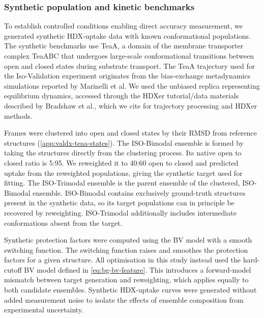\subsubsection{Synthetic population and kinetic benchmarks}
\label{sec:valdx-synthetic}

To establish controlled conditions enabling direct accuracy measurement, we generated synthetic HDX-uptake data with known conformational populations. The synthetic benchmarks use TeaA, a domain of the membrane transporter complex TeaABC that undergoes large-scale conformational transitions between open and closed states during substrate transport.\supercite{marinelliEvidenceAllostericMechanism2011,leeInterpretingHydrogenDeuteriumExchange2021} The TeaA trajectory used for the Iso-Validation experiment originates from the bias-exchange metadynamics simulations reported by Marinelli et al.\supercite{marinelliEvidenceAllostericMechanism2011} We used the unbiased replica representing equilibrium dynamics, accessed through the HDXer tutorial/data materials described by Bradshaw et al., which we cite for trajectory processing and HDXer methods.\supercite{bradshawInterpretationHDXData2020}

Frames were clustered into open and closed states by their RMSD from reference structures (\cref{app:valdx-teaa-states}). The ISO-Bimodal ensemble is formed by taking the structures directly from the clustering process. Its native open to closed ratio is 5:95. We reweighted it to 40:60 open to closed and predicted uptake from the reweighted populations, giving the synthetic target used for fitting. The ISO-Trimodal ensemble is the parent ensemble of the clustered, ISO-Bimodal ensemble. ISO-Bimodal contains exclusively ground-truth structures present in the synthetic data, so its target populations can in principle be recovered by reweighting. ISO-Trimodal additionally includes intermediate conformations absent from the target.

Synthetic protection factors were computed using the BV model with a smooth switching function. The switching function raises and smoothes the protection factors for a given structure. All optimisation in this study instead used the hard-cutoff BV model defined in \cref{eq:bg-bv-feature}. This introduces a forward-model mismatch between target generation and reweighting, which applies equally to both candidate ensembles. Synthetic HDX-uptake curves were generated without added measurement noise to isolate the effects of ensemble composition from experimental uncertainty.

